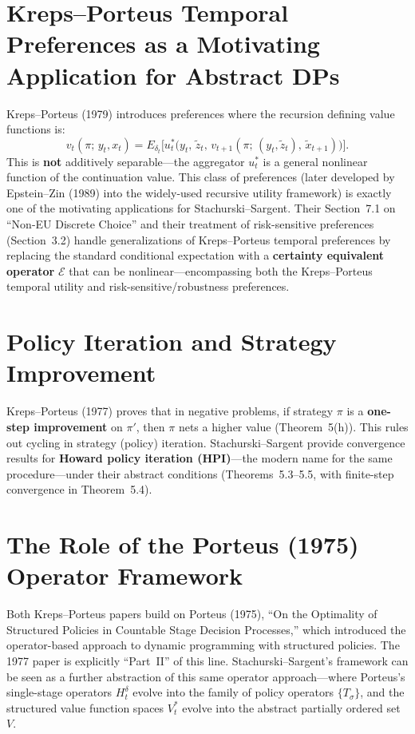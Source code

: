 \documentclass[12pt]{article}
\begin{document}
\section{Kreps--Porteus Temporal Preferences as a Motivating Application for Abstract DPs}

Kreps--Porteus (1979) introduces preferences where the recursion defining value functions is:
\[
v_t(\pi;\, y_t, x_t)
= E_{\delta_t}\!\bigl[u_t^*\bigl(y_t,\, \tilde{z}_t,\,
      v_{t+1}(\pi;\, (y_t, \tilde{z}_t),\, \tilde{x}_{t+1})\bigr)\bigr].
\]
This is \textbf{not} additively separable---the aggregator $u_t^*$ is a general nonlinear function of the continuation value. This class of preferences (later developed by Epstein--Zin (1989) into the widely-used recursive utility framework) is exactly one of the motivating applications for Stachurski--Sargent. Their Section~7.1 on ``Non-EU Discrete Choice'' and their treatment of risk-sensitive preferences (Section~3.2) handle generalizations of Kreps--Porteus temporal preferences by replacing the standard conditional expectation with a \textbf{certainty equivalent operator} $\mathcal{E}$ that can be nonlinear---encompassing both the Kreps--Porteus temporal utility and risk-sensitive/robustness preferences.


\section{Policy Iteration and Strategy Improvement}

Kreps--Porteus (1977) proves that in negative problems, if strategy $\pi$ is a \textbf{one-step improvement} on $\pi'$, then $\pi$ nets a higher value (Theorem~5(h)). This rules out cycling in strategy (policy) iteration. Stachurski--Sargent provide convergence results for \textbf{Howard policy iteration (HPI)}---the modern name for the same procedure---under their abstract conditions (Theorems~5.3--5.5, with finite-step convergence in Theorem~5.4).


\section{The Role of the Porteus (1975) Operator Framework}

Both Kreps--Porteus papers build on Porteus (1975), ``On the Optimality of Structured Policies in Countable Stage Decision Processes,'' which introduced the operator-based approach to dynamic programming with structured policies. The 1977 paper is explicitly ``Part~II'' of this line. Stachurski--Sargent's framework can be seen as a further abstraction of this same operator approach---where Porteus's single-stage operators $H_t^\delta$ evolve into the family of policy operators $\{T_\sigma\}$, and the structured value function spaces $V_t^*$ evolve into the abstract partially ordered set~$V$.
\end{document}
